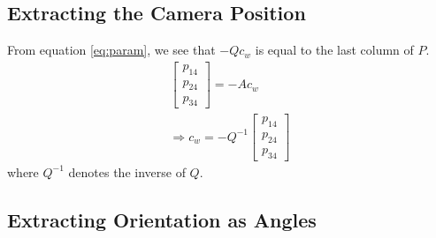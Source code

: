 \subsection{Extracting the Camera Position}

From equation \ref{eq:param}, we see that $-Qc_w$ is equal to the last column of $P$.
\begin{gather}
    \begin{bmatrix}
        p_{14} \\ p_{24} \\ p_{34}
    \end{bmatrix} = -Ac_w   \nonumber \\
    \Rightarrow \boxed{c_w = -Q^{-1}
    \begin{bmatrix}
        p_{14} \\ p_{24} \\ p_{34}
    \end{bmatrix}}
\end{gather}
where $Q^{-1}$ denotes the inverse of $Q$.

\subsection{Extracting Orientation as Angles}

